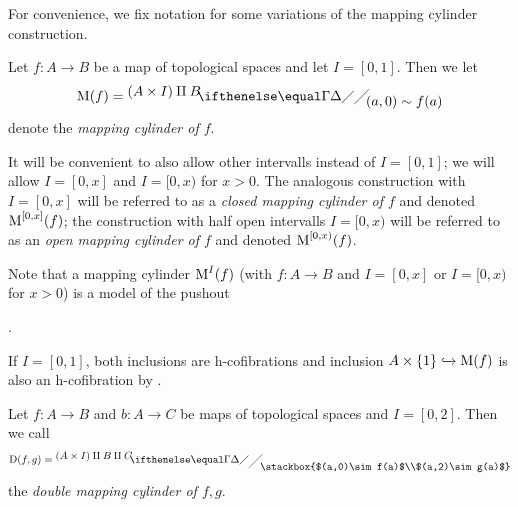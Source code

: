For convenience, we fix notation for some variations of the mapping cylinder construction.
\begin{definition}
    Let $f\colon A\to B$ be a map of topological spaces and let $I=[0,1]$.
    Then we let
    \begin{equation*}
        \M(f)=\newfaktor{\left(A\times I\right)\amalg B}{(a,0)\sim f(a)}
    \end{equation*}
    denote the \emph{mapping cylinder of $f$}.

    It will be convenient to also allow other intervalls instead of $I=[0,1]$; we will allow $I=[0,x]$ and $I=[0,x)$ for $x>0$.
    The analogous construction with $I=[0,x]$ will be referred to as a \emph{closed mapping cylinder of $f$} and denoted $\operatorname{M}^{[0,x]}(f)$;
    the construction with half open intervalls $I=[0,x)$ will be referred to as an \emph{open mapping cylinder of $f$} and denoted $\operatorname{M}^{[0,x)}(f)$.
\end{definition}
\begin{remark}\label{rmk:inclIntoMappingCylIsHCofib}
    Note that a mapping cylinder $\operatorname{M}^I(f)$ (with $f\colon A\to B$ and $I=[0,x]$ or $I=[0,x)$ for $x>0$) is a model of the pushout 
    \begin{center}
        \;.
    \end{center}
    If $I=[0,1]$, both inclusions are h-cofibrations and inclusion $A\times\left\lbrace1\right\rbrace\xhookrightarrow{}\operatorname{M}(f)$ is also an h-cofibration by \cite[Theorem 2]{note_on_cofibs_1}.
\end{remark}
\begin{definition}\label{def:doubleMappingCylinder}
    Let $f\colon A\to B$ and $b\colon A\to C$ be maps of topological spaces and $I=[0,2]$.
    Then we call
    \begin{equation*} %
        \D(f,g)=\newfaktor{\left(A\times I\right)\amalg B\amalg C}{\stackbox{$(a,0)\sim f(a)$\\$(a,2)\sim g(a)$}}[-1]
    \end{equation*}
    the \emph{double mapping cylinder of $f,g$}.
\end{definition}
